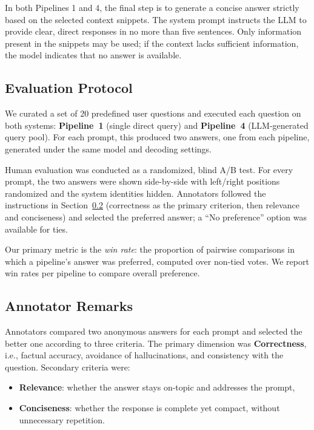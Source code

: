 \documentclass[manuscript,screen]{acmart}
\begin{document}
\begin{CCSXML}
		In both Pipelines 1 and 4, the final step is to generate a concise answer strictly based on the selected context snippets. The system prompt instructs the LLM to provide clear, direct responses in no more than five sentences. Only information present in the snippets may be used; if the context lacks sufficient information, the model indicates that no answer is available.
	
	
	\subsection{Evaluation Protocol}
	\label{subsec:evaluation-protocol}
	
	We curated a set of 20 predefined user questions and executed each question on
	both systems: \textbf{Pipeline~1} (single direct query) and \textbf{Pipeline~4}
	(LLM-generated query pool). For each prompt, this produced two answers, one from
	each pipeline, generated under the same model and decoding settings.
	
	Human evaluation was conducted as a randomized, blind A/B test. For every
	prompt, the two answers were shown side-by-side with left/right positions
	randomized and the system identities hidden. Annotators followed the instructions
	in Section~\ref{subsec:annotator-remarks} (correctness as the primary criterion,
	then relevance and conciseness) and selected the preferred answer; a “No
	preference” option was available for ties.
	
	Our primary metric is the \emph{win rate}: the proportion of pairwise
	comparisons in which a pipeline’s answer was preferred, computed over
	non-tied votes. We report win rates per pipeline to compare overall preference.
	
	\subsection{Annotator Remarks}
	\label{subsec:annotator-remarks}
	
	Annotators compared two anonymous answers for each prompt and selected the
	better one according to three criteria. The primary dimension was
	\textbf{Correctness}, i.e., factual accuracy, avoidance of hallucinations, and
	consistency with the question. Secondary criteria were:
	
	\begin{itemize}
	  \item \textbf{Relevance}: whether the answer stays on-topic and addresses the prompt,
	  \item \textbf{Conciseness}: whether the response is complete yet compact, without unnecessary repetition.
	\end{itemize}
	

\end{CCSXML}
\end{document}
